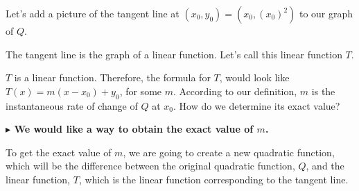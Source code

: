 \documentclass{ximera}
\begin{document}
Let's add a picture of the tangent line at $(x_0, y_0) = (x_0, (x_0)^2)$ to our graph of $Q$.


\begin{image}
\end{image}


The tangent line is the graph of a linear function. Let's call this linear function $T$.


$T$ is a linear function. Therefore, the formula for $T$, would look like $T(x) = m(x - x_0) + y_0$, for some $m$.  According to our definition, $m$ is the instantaneous rate of change of $Q$ at $x_0$.  How do we determine its exact value?



\textbf{\textcolor{blue!55!black}{$\blacktriangleright$ We would like a way to obtain the exact value of $m$.}} 


To get the exact value of $m$, we are going to create a new quadratic function, which will be the difference between the original quadratic function, $Q$, and the linear function, $T$, which is the linear function corresponding to the tangent line.
\end{document}
